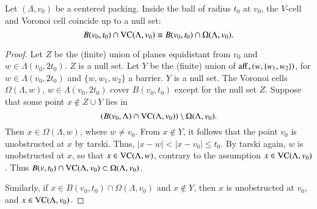 \begin{lemma}
Let $(\Lambda,v_0)$ be a centered packing.
Inside the ball of radius $t_0$ at $v_0$, the $V$-cell and
Voronoi cell coincide up to a null set:
   $$B(v_0,t_0)\cap {\operatorname{VC}}(\Lambda,v_0) \equiv B(v_0,t_0)\cap \Omega(\Lambda,v_0).$$
\end{lemma}

\begin{proof} Let $Z$ be the (finite) union of planes equidistant from $v_0$ and $w\in \Lambda(v_0,2t_0)$.  $Z$ is a null set.  Let $Y$ be the (finite) union of ${\operatorname{aff}}_+(w,\{w_1,w_2\})$, for $w\in \Lambda(v_0,2t_0)$ and $\{w,w_1,w_2\}$ a barrier.  $Y$ is a null set.
The Voronoi cells $\Omega(\Lambda,w)$, $w\in\Lambda(v_0,2t_0)$ cover
$B(v_0,t_0)$ except for the null set $Z$.  
Suppose that some point  $x\not\in Z\cup Y$
lies in $$(B(v_0,\Lambda)\cap{\operatorname{VC}}(\Lambda,v_0) )\setminus \Omega(\Lambda,v_0).$$
Then $x\in \Omega(\Lambda,w)$, where
$w\ne v_0$.  
From $x\not\in Y$, it follows that the point $v_0$ is
unobstructed  at $x$ by tarski.  
Thus, $|x-w|< |x-v_0|\le t_0$.  By
tarski again, $w$ is unobstructed at $x$, so
that $x\in {\operatorname{VC}}(\Lambda,w)$, contrary to the assumption
$x\in{\operatorname{VC}}(\Lambda,v_0)$.  Thus $B(v,t_0)\cap{\operatorname{VC}}(\Lambda,v_0)\subset\Omega(\Lambda,v_0)$.

Similarly, if $x\in B(v_0,t_0)\cap \Omega(\Lambda,v_0)$ and $x\not\in Y$,
then $x$ is
unobstructed at $v_0$, and $x\in {\operatorname{VC}}(\Lambda,v_0)$.
\end{proof}

\bigskip

%


